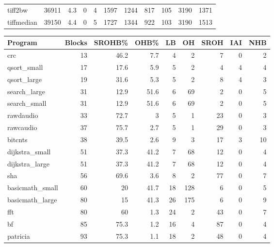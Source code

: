 \begin{tabular}{lrrrrrrrrrr}
 tiff2bw         &          36911 &      4.3 &    0   &    4 &   1597 &       1244 &          817 &   105 &  3190 &  1371 \\
 tiffmedian      &          39150 &      4.4 &    0   &    5 &   1727 &       1344 &          922 &   103 &  3190 &  1513 \\
\hline
\end{tabular}\begin{tabular}{lrrrrrrrr}
\hline
 Program         &   Blocks &   SROHB\% &   OHB\% &   LB &   OH &   SROH &   IAI &   NHB \\
\hline
 crc             &       13 &     46.2 &    7.7 &    4 &    2 &      7 &     0 &     2 \\
 qsort\_small     &       17 &     17.6 &    5.9 &    5 &    2 &      4 &     4 &     4 \\
 qsort\_large     &       19 &     31.6 &    5.3 &    5 &    2 &      8 &     4 &     3 \\
 search\_large    &       31 &     12.9 &   51.6 &    6 &   69 &      2 &     0 &     5 \\
 search\_small    &       31 &     12.9 &   51.6 &    6 &   69 &      2 &     0 &     5 \\
 rawdaudio       &       33 &     72.7 &    3   &    5 &    1 &     23 &     0 &     3 \\
 rawcaudio       &       37 &     75.7 &    2.7 &    5 &    1 &     29 &     0 &     3 \\
 bitcnts         &       38 &     39.5 &    2.6 &    9 &    3 &     17 &     3 &    10 \\
 dijkstra\_small  &       51 &     37.3 &   41.2 &    7 &   68 &     12 &     0 &     4 \\
 dijkstra\_large  &       51 &     37.3 &   41.2 &    7 &   68 &     12 &     0 &     4 \\
 sha             &       56 &     69.6 &    3.6 &    8 &    2 &     77 &     0 &     7 \\
 basicmath\_small &       60 &     20   &   41.7 &   18 &  128 &      6 &     0 &     5 \\
 basicmath\_large &       80 &     15   &   41.3 &   26 &  175 &      6 &     0 &     9 \\
 fft             &       80 &     60   &    1.3 &   24 &    2 &     43 &     0 &     7 \\
 bf              &       85 &     75.3 &    1.2 &   16 &    4 &     87 &     0 &     4 \\
 patricia        &       93 &     75.3 &    1.1 &   18 &    2 &     48 &     0 &     4 \\

\end{tabular}
